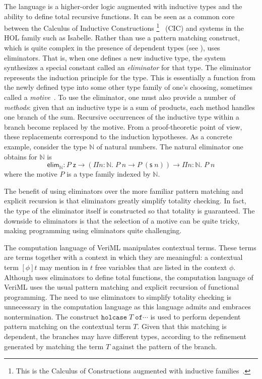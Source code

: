 The language \lhol{} is a higher-order logic augmented with inductive types and
the ability to define total recursive functions.
It can be seen as a common core between the Calculus of Inductive
Constructions%
\footnote{%
  This is the Calculus of Constructions augmented with inductive
  families~\cite{dybjer-inductive}. %
}~\cite{cic} (CIC) and systems in the HOL family such as Isabelle.
Rather than use a pattern matching construct, which is quite complex in the
presence of dependent types (see \cite{goguen-eliminating-2006}), \lhol{} uses
eliminators.
That is, when one defines a new inductive type, the system synthesizes a special
constant called an \emph{eliminator} for that type.
The eliminator represents the induction principle for the type.
This is essentially a function from the newly defined type into some other type
family of one's choosing, sometimes called a
\emph{motive}~\cite{mcbride-elimination-2002}.
To use the eliminator, one must also provide a number of \emph{methods}: given
that an inductive type is a sum of products, each method handles one branch of
the sum. Recursive occurrences of the inductive type within a branch become
replaced by the motive. From a proof-theoretic point of view, these replacements
correspond to the induction hypotheses.
As a concrete example, consider the type $\mathbb{N}$ of natural numbers.
The natural eliminator one obtains for $\mathbb{N}$ is
\[
  \mathsf{elim}_\mathbb{N} :
  P\;\mathsf{z} \to
  (\Pi n{:}\mathbb{N}.\; P\; n \to P\;(\mathsf{s}\; n)) \to
  \Pi n{:}\mathbb{N}.\; P\; n
\]
where the motive $P$ is a type family indexed by $\mathbb{N}$.

The benefit of using eliminators over the more familiar pattern matching and
explicit recursion is that eliminators greatly simplify totality checking.
In fact, the type of the eliminator itself is constructed so that totality is
guaranteed.
The downside to eliminators is that the selection of a motive can be quite
tricky, making programming using eliminators quite challenging.

The computation language of VeriML manipulates contextual \lhol{} terms.
These terms are \lhol{} terms together with a context in which they are
meaningful:
a contextual term $[\phi] t$ may mention in $t$ free variables that are listed
in the context $\phi$.
Although \lhol{} uses eliminators to define total functions, the computation
language of VeriML uses the usual pattern matching and explicit recursion of
functional programming.
The need to use eliminators to simplify totality checking is unnecessary in the
computation language as this language admits and embraces nontermination.
The construct $\mathtt{holcase}\;T\;\mathtt{of}\cdots$ is used to perform
dependent pattern matching on the contextual \lhol{} term $T$.
Given that this matching is dependent, the branches may have different types,
according to the refinement generated by matching the term $T$ against the
pattern of the branch.

